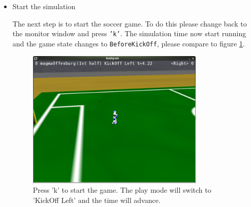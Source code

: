 \begin{itemize}
\item{Start the simulation}

The next step is to start the soccer game. To do this please change
back to the monitor window and press \texttt{'k'}. The simulation time
now start running and the game state changes to
\texttt{BeforeKickOff}, please compare to figure \ref{fig:presskickoff}.

\begin{figure}[htbp]
\begin{center}
\includegraphics[width=0.8\textwidth]{fig/presskickoff}
\caption{Press 'k' to start the game. The play mode will switch to 'KickOff
Left' and the time will advance.}
\label{fig:presskickoff}
\end{center}
\end{figure}

\end{itemize}



